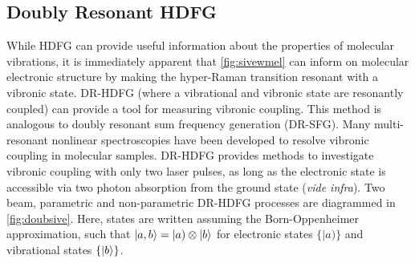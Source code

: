 \documentclass[aip, jcp, reprint, onecolumn]{revtex4-2}
\begin{document}
\subsection{Doubly Resonant HDFG}
While HDFG can provide useful information about the properties of molecular vibrations, it is immediately apparent that \autoref{fig:sivewmel} can inform on molecular electronic structure by making the hyper-Raman transition resonant with a vibronic state.
DR-HDFG (where a vibrational and vibronic state are resonantly coupled) can provide a tool for measuring vibronic coupling.
This method is analogous to doubly resonant sum frequency generation (DR-SFG). \cite{Shen94}
Many multi-resonant nonlinear spectroscopies have been developed to resolve vibronic coupling in molecular samples. \cite{Carlson1990, Gaynor2017, RN276}
DR-HDFG provides methods to investigate vibronic coupling with only two laser pulses, as long as the electronic state is accessible via two photon absorption from the ground state (\textit{vide infra}).
Two beam, parametric and non-parametric DR-HDFG processes are diagrammed in \autoref{fig:doubsive}.
Here, states are written assuming the Born-Oppenheimer approximation, such that $\ket{a,b} = |a) \otimes \ket{b}$ for electronic states $\{|a)\}$ and vibrational states $\{\ket{b}\}$. \cite{BornOppenheimer, Albrecht1960}
\end{document}
